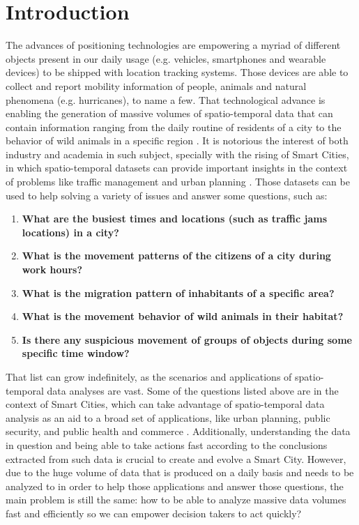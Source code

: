 \chapter{Introduction}
\label{chp:introduction}
The advances of positioning technologies are empowering a myriad of different objects present in our daily usage (e.g.
vehicles, smartphones and wearable devices) to be shipped with location tracking systems. Those devices are able to
collect and report mobility information of people, animals and natural phenomena (e.g. hurricanes), to name a few. That
technological advance is enabling the generation of massive volumes of spatio-temporal data that can contain information
ranging from the daily routine of residents of a city \citep{whatdidyoudo} to the behavior of wild animals in a specific
region \citep{trajclustering}\citep{miningperiodic}. It is notorious the interest of both industry and academia in such
subject, specially with the rising of Smart Cities, in which spatio-temporal datasets can provide important insights in
the context of problems like traffic management and urban planning \citep{gissmartcities}\citep{parallelsmartcities}.
Those datasets can be used to help solving a variety of issues and answer some questions, such as:

\begin{enumerate}
    \item \textbf{What are the busiest times and locations (such as traffic jams locations) in a city?}
        \citep{visualtrafficjam}
    \item \textbf{What is the movement patterns of the citizens of a city during work hours?}
    \item \textbf{What is the migration pattern of inhabitants of a specific area?}
    \item \textbf{What is the movement behavior of wild animals in their habitat?} \citep{movemine}
    \item \textbf{Is there any suspicious movement of groups of objects during some specific time window?}
\end{enumerate}

That list can grow indefinitely, as the scenarios and applications of spatio-temporal data analyses are vast. Some of
the questions listed above are in the context of Smart Cities, which can take advantage of spatio-temporal data analysis
as an aid to a broad set of applications, like urban planning, public security, and public health and commerce
\citep{ieeesmartcities}. Additionally, understanding the data in question and being able to take actions fast according
to the conclusions extracted from such data is crucial to create and evolve a Smart City. However, due to the huge
volume of data that is produced on a daily basis and needs to be analyzed to in order to help those applications and
answer those questions, the main problem is still the same: how to be able to analyze massive data volumes fast and
efficiently so we can empower decision takers to act quickly?


